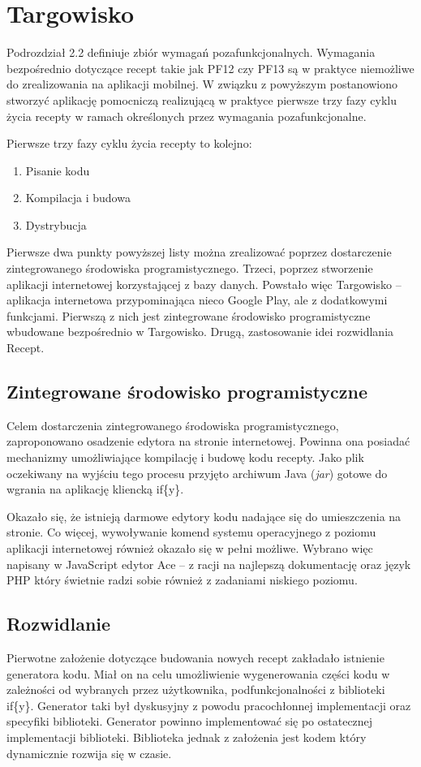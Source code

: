 \documentclass[11pt,a4paper,polish,thesis]{dcsbook}
\begin{document}
\section{Targowisko}
Podrozdział 2.2 definiuje zbiór wymagań pozafunkcjonalnych. Wymagania bezpośrednio dotyczące recept takie jak PF12 czy PF13 są w praktyce niemożliwe do zrealizowania
na aplikacji mobilnej. W związku z powyższym postanowiono stworzyć aplikację pomocniczą realizującą w praktyce pierwsze trzy fazy cyklu życia recepty w
ramach określonych przez wymagania pozafunkcjonalne.

Pierwsze trzy fazy cyklu życia recepty to kolejno:
\begin{enumerate}
\item Pisanie kodu
\item Kompilacja i budowa
\item Dystrybucja
\end{enumerate}

Pierwsze dwa punkty powyższej listy można zrealizować poprzez dostarczenie zintegrowanego środowiska programistycznego. Trzeci, poprzez stworzenie aplikacji
internetowej korzystającej z bazy danych. Powstało więc Targowisko -- aplikacja internetowa przypominająca nieco Google Play, ale z dodatkowymi funkcjami.
Pierwszą z nich jest zintegrowane środowisko programistyczne wbudowane bezpośrednio w Targowisko. Drugą, zastosowanie idei rozwidlania Recept.

\subsection{Zintegrowane środowisko programistyczne}
Celem dostarczenia zintegrowanego środowiska programistycznego, zaproponowano osadzenie edytora na stronie internetowej. Powinna ona posiadać mechanizmy umożliwiające
kompilację i budowę kodu recepty. Jako plik oczekiwany na wyjściu tego procesu przyjęto archiwum Java (\emph{jar}) gotowe do wgrania na aplikację kliencką if\{y\}.

Okazało się, że istnieją darmowe edytory kodu nadające się do umieszczenia na stronie. Co więcej, wywoływanie komend systemu operacyjnego z poziomu aplikacji
internetowej również okazało się w pełni możliwe. Wybrano więc napisany w JavaScript edytor Ace -- z racji na najlepszą dokumentację oraz język PHP który
świetnie radzi sobie również z zadaniami niskiego poziomu.
\subsection{Rozwidlanie}
Pierwotne założenie dotyczące budowania nowych recept zakładało istnienie generatora kodu. Miał on na celu umożliwienie wygenerowania części kodu w zależności od
wybranych przez użytkownika, podfunkcjonalności z biblioteki if\{y\}. Generator taki był dyskusyjny z powodu pracochłonnej implementacji oraz specyfiki biblioteki.
Generator powinno implementować się po ostatecznej implementacji biblioteki. Biblioteka jednak z założenia jest kodem który dynamicznie rozwija się w czasie.
\end{document}
